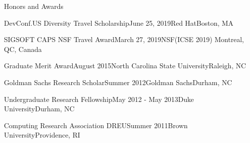 \documentclass{resume} %
\begin{document}
\begin{rSection}{Honors and Awards}

\begin{sSubsection}
{DevConf.US Diversity Travel Scholarship}{June 25, 2019}{Red Hat}{Boston, MA}
\end{sSubsection}
\vspace{-5pt}

\begin{sSubsection}
{SIGSOFT CAPS NSF Travel Award}{March 27, 2019}{NSF}{(ICSE 2019) Montreal, QC, Canada}
\end{sSubsection}
\vspace{-5pt}

\begin{sSubsection}
{Graduate Merit Award}{August 2015}{North Carolina State University}{Raleigh, NC}
\end{sSubsection}
\vspace{-5pt}

\begin{sSubsection}
{Goldman Sachs Research Scholar}{Summer 2012}{Goldman Sachs}{Durham, NC}
\end{sSubsection}
\vspace{-5pt}

\begin{sSubsection}
{Undergraduate Research Fellowship}{May 2012 - May 2013}{Duke University}{Durham, NC}
\end{sSubsection}
\vspace{-5pt}

\begin{sSubsection}
{Computing Research Association DREU}{Summer 2011}{Brown University}{Providence, RI}
\end{sSubsection}
\vspace{-5pt}

\end{rSection}



\end{document}

